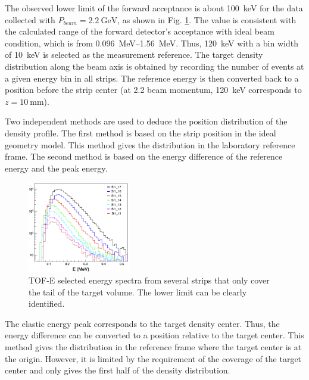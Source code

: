 \documentclass[fleqn,twocolumn,a4paper]{ikpar}
\begin{document}
The observed lower limit of the forward acceptance is about \SI{100}{\keV} for
the data collected with $P_{beam} = \SI{2.2}{\GeV}$, as shown in Fig. \ref{fig:spectrums}.
The value is consistent with the calculated range of the forward detector's
acceptance with ideal beam condition, which is from \SIrange{0.096}{1.56}{\MeV}.
Thus, \SI{120}{keV} with a bin width of \SI{10}{\keV} is selected as the
measurement reference.
The target density distribution along the beam axis is obtained by recording the
number of events at a given energy bin in all strips.
The reference energy is then converted back to a position before the strip center
(at \SI{2.2}{\momentum} beam momentum, \SI{120}{\keV} corresponds to $z=\SI{10}{\mm}$).
\par
\medskip

Two independent methods are used to deduce the position distribution of the density profile.
The first method is based on the strip position in the ideal geometry model.
This method gives the distribution in the laboratory reference frame.
The second method is based on the energy difference of the reference energy and
the peak energy.
\begin{figure}[b!]
  \centering
	\includegraphics[width=0.4\textwidth]{./spectrums.png}
  \caption{TOF-E selected energy spectra from several strips that only cover the tail of the target volume. The lower limit can be clearly identified.}
  \label{fig:spectrums}
\end{figure}
The elastic energy peak corresponds to the target density center.
Thus, the energy difference can be converted to a position relative to the target center. 
This method gives the distribution in the reference frame where the
target center is at the origin.
However, it is limited by the requirement of the coverage of the target center
and only gives the first half of the density distribution.
\end{document}
